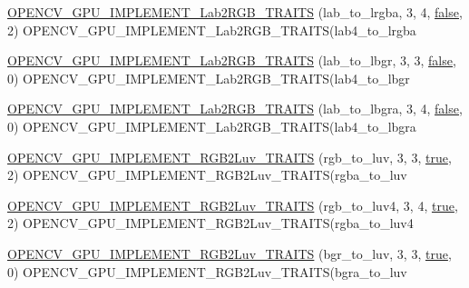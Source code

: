 \begin{DoxyCompactItemize}
\item 
\hyperlink{namespacecv_1_1gpu_1_1device_a1908f12ea56abc5d2ea15188ffed1800}{O\-P\-E\-N\-C\-V\-\_\-\-G\-P\-U\-\_\-\-I\-M\-P\-L\-E\-M\-E\-N\-T\-\_\-\-Lab2\-R\-G\-B\-\_\-\-T\-R\-A\-I\-T\-S} (lab\-\_\-to\-\_\-lrgba, 3, 4, \hyperlink{namespacecv_1_1gpu_1_1device_af8d6418be1712e83b4f398e7e7273026}{false}, 2) O\-P\-E\-N\-C\-V\-\_\-\-G\-P\-U\-\_\-\-I\-M\-P\-L\-E\-M\-E\-N\-T\-\_\-\-Lab2\-R\-G\-B\-\_\-\-T\-R\-A\-I\-T\-S(lab4\-\_\-to\-\_\-lrgba
\item 
\hyperlink{namespacecv_1_1gpu_1_1device_a4c5a2c9866b7731ad702179c3bcfa70a}{O\-P\-E\-N\-C\-V\-\_\-\-G\-P\-U\-\_\-\-I\-M\-P\-L\-E\-M\-E\-N\-T\-\_\-\-Lab2\-R\-G\-B\-\_\-\-T\-R\-A\-I\-T\-S} (lab\-\_\-to\-\_\-lbgr, 3, 3, \hyperlink{namespacecv_1_1gpu_1_1device_af8d6418be1712e83b4f398e7e7273026}{false}, 0) O\-P\-E\-N\-C\-V\-\_\-\-G\-P\-U\-\_\-\-I\-M\-P\-L\-E\-M\-E\-N\-T\-\_\-\-Lab2\-R\-G\-B\-\_\-\-T\-R\-A\-I\-T\-S(lab4\-\_\-to\-\_\-lbgr
\item 
\hyperlink{namespacecv_1_1gpu_1_1device_a1a0e2850a36f0952ccd212b18a67e27f}{O\-P\-E\-N\-C\-V\-\_\-\-G\-P\-U\-\_\-\-I\-M\-P\-L\-E\-M\-E\-N\-T\-\_\-\-Lab2\-R\-G\-B\-\_\-\-T\-R\-A\-I\-T\-S} (lab\-\_\-to\-\_\-lbgra, 3, 4, \hyperlink{namespacecv_1_1gpu_1_1device_af8d6418be1712e83b4f398e7e7273026}{false}, 0) O\-P\-E\-N\-C\-V\-\_\-\-G\-P\-U\-\_\-\-I\-M\-P\-L\-E\-M\-E\-N\-T\-\_\-\-Lab2\-R\-G\-B\-\_\-\-T\-R\-A\-I\-T\-S(lab4\-\_\-to\-\_\-lbgra
\item 
\hyperlink{namespacecv_1_1gpu_1_1device_a47180a517a462bb574c3aa24c8139f69}{O\-P\-E\-N\-C\-V\-\_\-\-G\-P\-U\-\_\-\-I\-M\-P\-L\-E\-M\-E\-N\-T\-\_\-\-R\-G\-B2\-Luv\-\_\-\-T\-R\-A\-I\-T\-S} (rgb\-\_\-to\-\_\-luv, 3, 3, \hyperlink{namespacecv_1_1gpu_1_1device_ac34c172a7a1904fb0fd477321a31f926}{true}, 2) O\-P\-E\-N\-C\-V\-\_\-\-G\-P\-U\-\_\-\-I\-M\-P\-L\-E\-M\-E\-N\-T\-\_\-\-R\-G\-B2\-Luv\-\_\-\-T\-R\-A\-I\-T\-S(rgba\-\_\-to\-\_\-luv
\item 
\hyperlink{namespacecv_1_1gpu_1_1device_a20ce8dbe12528e809d4c6d8dd9317ce9}{O\-P\-E\-N\-C\-V\-\_\-\-G\-P\-U\-\_\-\-I\-M\-P\-L\-E\-M\-E\-N\-T\-\_\-\-R\-G\-B2\-Luv\-\_\-\-T\-R\-A\-I\-T\-S} (rgb\-\_\-to\-\_\-luv4, 3, 4, \hyperlink{namespacecv_1_1gpu_1_1device_ac34c172a7a1904fb0fd477321a31f926}{true}, 2) O\-P\-E\-N\-C\-V\-\_\-\-G\-P\-U\-\_\-\-I\-M\-P\-L\-E\-M\-E\-N\-T\-\_\-\-R\-G\-B2\-Luv\-\_\-\-T\-R\-A\-I\-T\-S(rgba\-\_\-to\-\_\-luv4
\item 
\hyperlink{namespacecv_1_1gpu_1_1device_a83d62f4b843a603dbbaaa796a122436e}{O\-P\-E\-N\-C\-V\-\_\-\-G\-P\-U\-\_\-\-I\-M\-P\-L\-E\-M\-E\-N\-T\-\_\-\-R\-G\-B2\-Luv\-\_\-\-T\-R\-A\-I\-T\-S} (bgr\-\_\-to\-\_\-luv, 3, 3, \hyperlink{namespacecv_1_1gpu_1_1device_ac34c172a7a1904fb0fd477321a31f926}{true}, 0) O\-P\-E\-N\-C\-V\-\_\-\-G\-P\-U\-\_\-\-I\-M\-P\-L\-E\-M\-E\-N\-T\-\_\-\-R\-G\-B2\-Luv\-\_\-\-T\-R\-A\-I\-T\-S(bgra\-\_\-to\-\_\-luv

\end{DoxyCompactItemize}
